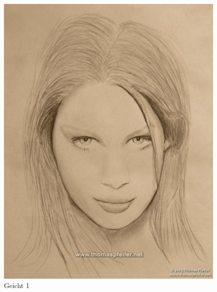 \begin{figure}[h]
	\begin{minipage}[h]{5cm}
		\centering
			\includegraphics[width=1\textwidth]{bilder/bilder.jpg}
		\caption{Geicht 1}
		\label{gig:Gesicht1}
	\end{minipage}
	\hfill
	\begin{minipage}[h]{5cm}
		\centering

\end{minipage}
\end{figure}
